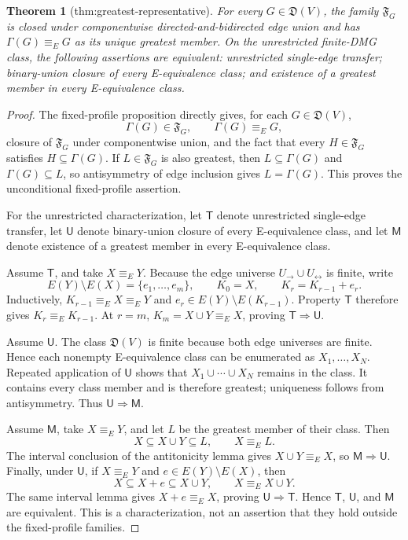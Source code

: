 \documentclass{article}
\newtheorem{theorem}{Theorem}
\begin{document}
\begin{theorem}[thm:greatest-representative]\label{thm:greatest-representative}
For every \(G\in\mathfrak D(V)\), the family \(\mathfrak F_G\) is closed under componentwise directed-and-bidirected edge union and has \(\Gamma(G)\equiv_EG\) as its unique greatest member. On the unrestricted finite-DMG class, the following assertions are equivalent: unrestricted single-edge transfer; binary-union closure of every E-equivalence class; and existence of a greatest member in every E-equivalence class.
\end{theorem}
\begin{proof}
The fixed-profile proposition directly gives, for each \(G\in\mathfrak D(V)\),
\[
 \Gamma(G)\in\mathfrak F_G,
 \qquad \Gamma(G)\equiv_EG,
\]
closure of \(\mathfrak F_G\) under componentwise union, and the fact that every \(H\in\mathfrak F_G\) satisfies \(H\subseteq\Gamma(G)\).  If \(L\in\mathfrak F_G\) is also greatest, then \(L\subseteq\Gamma(G)\) and \(\Gamma(G)\subseteq L\), so antisymmetry of edge inclusion gives \(L=\Gamma(G)\).  This proves the unconditional fixed-profile assertion.

For the unrestricted characterization, let \(\mathsf T\) denote unrestricted single-edge transfer, let \(\mathsf U\) denote binary-union closure of every E-equivalence class, and let \(\mathsf M\) denote existence of a greatest member in every E-equivalence class.

Assume \(\mathsf T\), and take \(X\equiv_EY\).  Because the edge universe \(U_{\to}\cup U_{\leftrightarrow}\) is finite, write
\[
 E(Y)\setminus E(X)=\{e_1,\ldots,e_m\},\qquad
 K_0=X,\qquad K_r=K_{r-1}+e_r.
\]
Inductively, \(K_{r-1}\equiv_EX\equiv_EY\) and \(e_r\in E(Y)\setminus E(K_{r-1})\).  Property \(\mathsf T\) therefore gives \(K_r\equiv_EK_{r-1}\).  At \(r=m\), \(K_m=X\cup Y\equiv_EX\), proving \(\mathsf T\Rightarrow\mathsf U\).

Assume \(\mathsf U\).  The class \(\mathfrak D(V)\) is finite because both edge universes are finite.  Hence each nonempty E-equivalence class can be enumerated as \(X_1,\ldots,X_N\).  Repeated application of \(\mathsf U\) shows that \(X_1\cup\cdots\cup X_N\) remains in the class.  It contains every class member and is therefore greatest; uniqueness follows from antisymmetry.  Thus \(\mathsf U\Rightarrow\mathsf M\).

Assume \(\mathsf M\), take \(X\equiv_EY\), and let \(L\) be the greatest member of their class.  Then
\[
 X\subseteq X\cup Y\subseteq L,
 \qquad X\equiv_EL.
\]
The interval conclusion of the antitonicity lemma gives \(X\cup Y\equiv_EX\), so \(\mathsf M\Rightarrow\mathsf U\).  Finally, under \(\mathsf U\), if \(X\equiv_EY\) and \(e\in E(Y)\setminus E(X)\), then
\[
 X\subseteq X+e\subseteq X\cup Y,
 \qquad X\equiv_E X\cup Y.
\]
The same interval lemma gives \(X+e\equiv_EX\), proving \(\mathsf U\Rightarrow\mathsf T\).  Hence \(\mathsf T\), \(\mathsf U\), and \(\mathsf M\) are equivalent.  This is a characterization, not an assertion that they hold outside the fixed-profile families.
\end{proof}
\end{document}
